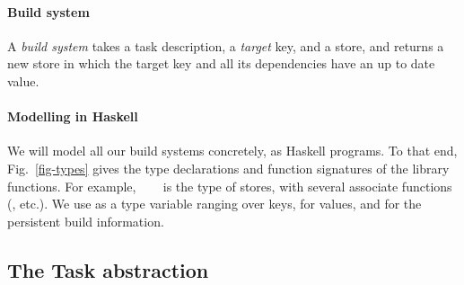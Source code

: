\vspace{-2mm}
\paragraph{Build system} A \emph{build system} takes a task description, a
\emph{target} key, and a store, and returns a new store in which the target key
and all its dependencies have an up to date value.

\vspace{-2mm}
\paragraph{Modelling in Haskell} We will model all our build systems concretely,
as Haskell programs. To that end, Fig.~\ref{fig-types} gives the type
declarations and function signatures of the library functions. For example,
~~~ is the type of stores, with several associate
functions (, etc.). We use  as a type
variable ranging over keys,  for values, and  for the persistent
build information.

\subsection{The Task abstraction}\label{sec-task}


